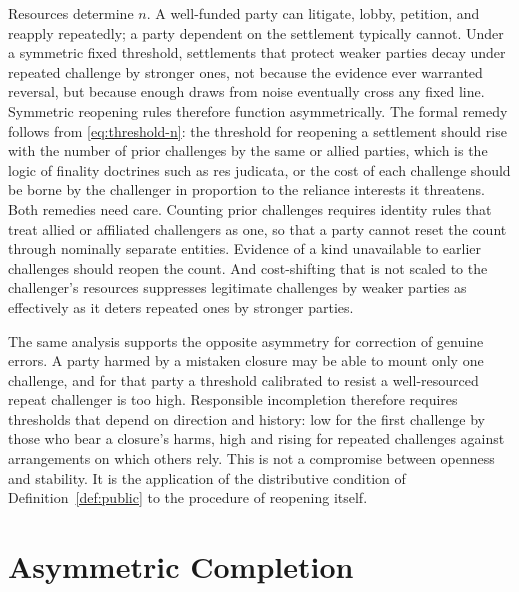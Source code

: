 Resources determine $n$. A well-funded party can litigate, lobby, petition, and reapply repeatedly; a party dependent on the settlement typically cannot. Under a symmetric fixed threshold, settlements that protect weaker parties decay under repeated challenge by stronger ones, not because the evidence ever warranted reversal, but because enough draws from noise eventually cross any fixed line. Symmetric reopening rules therefore function asymmetrically. The formal remedy follows from \eqref{eq:threshold-n}: the threshold for reopening a settlement should rise with the number of prior challenges by the same or allied parties, which is the logic of finality doctrines such as res judicata, or the cost of each challenge should be borne by the challenger in proportion to the reliance interests it threatens. Both remedies need care. Counting prior challenges requires identity rules that treat allied or affiliated challengers as one, so that a party cannot reset the count through nominally separate entities. Evidence of a kind unavailable to earlier challenges should reopen the count. And cost-shifting that is not scaled to the challenger's resources suppresses legitimate challenges by weaker parties as effectively as it deters repeated ones by stronger parties.

The same analysis supports the opposite asymmetry for correction of genuine errors. A party harmed by a mistaken closure may be able to mount only one challenge, and for that party a threshold calibrated to resist a well-resourced repeat challenger is too high. Responsible incompletion therefore requires thresholds that depend on direction and history: low for the first challenge by those who bear a closure's harms, high and rising for repeated challenges against arrangements on which others rely. This is not a compromise between openness and stability. It is the application of the distributive condition of Definition~\ref{def:public} to the procedure of reopening itself.

\section{Asymmetric Completion}\label{sec:asymmetric}

